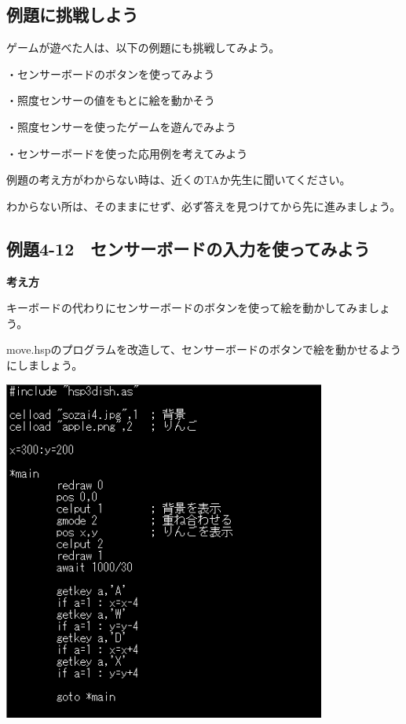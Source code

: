 \documentclass[a4paper,12pt]{jarticle}
\begin{document}
\bigskip

\subsection{例題に挑戦しよう}

\bigskip
\bigskip

ゲームが遊べた人は、以下の例題にも挑戦してみよう。

\bigskip

・センサーボードのボタンを使ってみよう

・照度センサーの値をもとに絵を動かそう

・照度センサーを使ったゲームを遊んでみよう

・センサーボードを使った応用例を考えてみよう


\bigskip

例題の考え方がわからない時は、近くのTAか先生に聞いてください。

わからない所は、そのままにせず、必ず答えを見つけてから先に進みましょう。

\clearpage
\subsection{例題4-12　センサーボードの入力を使ってみよう}
\bigskip
\bigskip

{\bfseries
考え方}

\bigskip

キーボードの代わりにセンサーボードのボタンを使って絵を動かしてみましょう。

move.hspのプログラムを改造して、センサーボードのボタンで絵を動かせるようにしましょう。

\bigskip
\bigskip

\begin{minipage}{9.781cm}
\centering
{\upshape
\includegraphics[keepaspectratio,width=10.61cm,height=11.229cm]{text04-img/text04-img037.png}}
\end{minipage}
\end{document}
